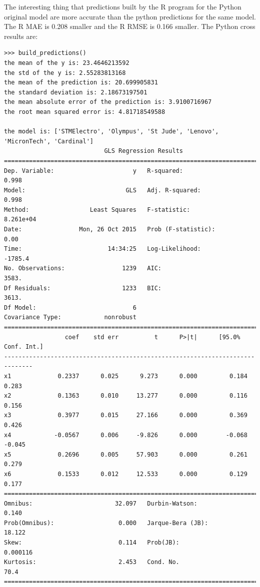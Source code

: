 \documentclass[
  twoside,
  12pt, a4paper,
  footinclude=true,
  headinclude=true,
  cleardoublepage=empty
]{article}
\begin{document}
The interesting thing that predictions built by the R program for the Python original model are more accurate than the python predictions for the same model. The R  MAE is 0.208 smaller and the R RMSE is 0.166 smaller.
The Python cross results are:
\begin{verbatim}
>>> build_predictions()
the mean of the y is: 23.4646213592
the std of the y is: 2.55283813168
the mean of the prediction is: 20.699905831
the standard deviation is: 2.18673197501
the mean absolute error of the prediction is: 3.9100716967
the root mean squared error is: 4.81718549588

the model is: ['STMElectro', 'Olympus', 'St Jude', 'Lenovo', 'MicronTech', 'Cardinal']
                            GLS Regression Results                            
==============================================================================
Dep. Variable:                      y   R-squared:                       0.998
Model:                            GLS   Adj. R-squared:                  0.998
Method:                 Least Squares   F-statistic:                 8.261e+04
Date:                Mon, 26 Oct 2015   Prob (F-statistic):               0.00
Time:                        14:34:25   Log-Likelihood:                -1785.4
No. Observations:                1239   AIC:                             3583.
Df Residuals:                    1233   BIC:                             3613.
Df Model:                           6                                         
Covariance Type:            nonrobust                                         
==============================================================================
                 coef    std err          t      P>|t|      [95.0% Conf. Int.]
------------------------------------------------------------------------------
x1             0.2337      0.025      9.273      0.000         0.184     0.283
x2             0.1363      0.010     13.277      0.000         0.116     0.156
x3             0.3977      0.015     27.166      0.000         0.369     0.426
x4            -0.0567      0.006     -9.826      0.000        -0.068    -0.045
x5             0.2696      0.005     57.903      0.000         0.261     0.279
x6             0.1533      0.012     12.533      0.000         0.129     0.177
==============================================================================
Omnibus:                       32.097   Durbin-Watson:                   0.140
Prob(Omnibus):                  0.000   Jarque-Bera (JB):               18.122
Skew:                           0.114   Prob(JB):                     0.000116
Kurtosis:                       2.453   Cond. No.                         70.4
==============================================================================
\end{verbatim}
\end{document}
